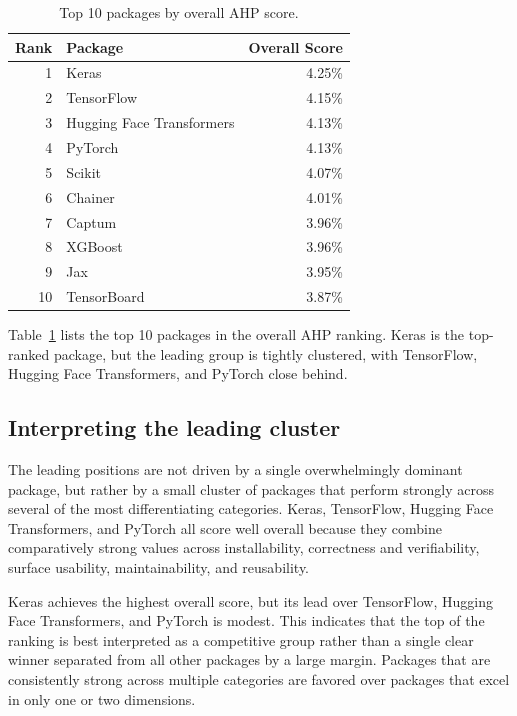\documentclass[final,1p,times,authoryear,12pt]{elsarticle}
\begin{document}
\begin{table}[H]
\centering
\caption{Top 10 packages by overall AHP score.}
\label{tab:top10-ranking}
\begin{tabular}{r l r}
\toprule
\textbf{Rank} & \textbf{Package} & \textbf{Overall Score} \\
\midrule
1  & Keras                     & 4.25\% \\
2  & TensorFlow                & 4.15\% \\
3  & Hugging Face Transformers & 4.13\% \\
4  & PyTorch                   & 4.13\% \\
5  & Scikit                    & 4.07\% \\
6  & Chainer                   & 4.01\% \\
7  & Captum                    & 3.96\% \\
8  & XGBoost                   & 3.96\% \\
9  & Jax                       & 3.95\% \\
10 & TensorBoard               & 3.87\% \\
\bottomrule
\end{tabular}
\end{table}

Table~\ref{tab:top10-ranking} lists the top 10 packages in
the overall AHP ranking. Keras is the top-ranked package,
but the leading group is tightly clustered, with
TensorFlow, Hugging Face Transformers, and PyTorch close
behind.

\subsection{Interpreting the leading cluster}

The leading positions are not driven by a single
overwhelmingly dominant package, but rather by a small
cluster of packages that perform strongly across several of
the most differentiating categories. Keras, TensorFlow,
Hugging Face Transformers, and PyTorch all score well
overall because they combine comparatively strong values
across installability, correctness and verifiability,
surface usability, maintainability, and reusability.

Keras achieves the highest overall score, but its lead over
TensorFlow, Hugging Face Transformers, and PyTorch is
modest. This indicates that the top of the ranking is best
interpreted as a competitive group rather than a single
clear winner separated from all other packages by a large
margin. Packages that are consistently strong across
multiple categories are favored over packages that excel in
only one or two dimensions.
\end{document}
